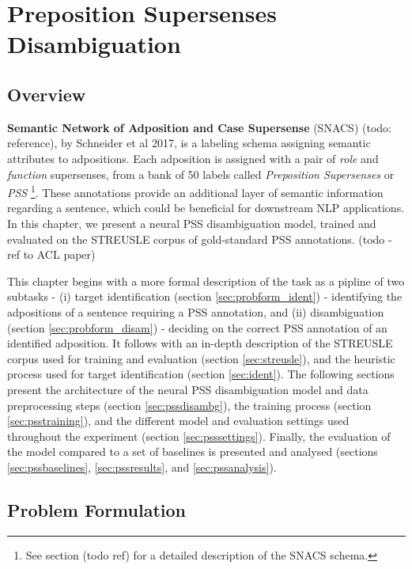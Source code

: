 
\chapter{Preposition Supersenses Disambiguation} %

\label{Chapter2} %

\section{Overview}
\textbf{Semantic Network of Adposition and Case Supersense} (SNACS) (todo: reference), by Schneider et al 2017, is a labeling schema assigning semantic attributes to adpositions. Each adposition is assigned with a pair of \emph{role} and \emph{function} supersenses, from a bank of 50 labels called \emph{Preposition Supersenses} or \emph{PSS} \footnote{See section (todo ref) for a detailed description of the SNACS schema.}. These annotations provide an additional layer of semantic information regarding a sentence, which could be beneficial for downstream NLP applications. In this chapter, we present a neural PSS disambiguation model, trained and evaluated on the STREUSLE corpus of gold-standard PSS annotations. (todo - ref to ACL paper)

This chapter begins with a more formal description of the task as a pipline of two subtasks - (i) target identification (section \ref{sec:probform_ident}) - identifying the adpositions of a sentence requiring a PSS annotation, and (ii) disambiguation (section \ref{sec:probform_disam}) - deciding on the correct PSS annotation of an identified adposition. It follows with an in-depth description of the STREUSLE corpus used for training and evaluation (section \ref{sec:streusle}), and the heuristic process used for target identification (section \ref{sec:ident}). The following sections present the architecture of the neural PSS disambiguation model and data preprocessing steps (section \ref{sec:pssdisambg}), the training process (section \ref{sec:psstraining}), and the different model and evaluation settings used throughout the experiment (section \ref{sec:psssettings}).  Finally, the evaluation of the model compared to a set of baselines is presented and analysed (sections \ref{sec:pssbaselines}, \ref{sec:pssresults}, and \ref{sec:pssanalysis}).

\section{Problem Formulation} \label{sec:probform}
